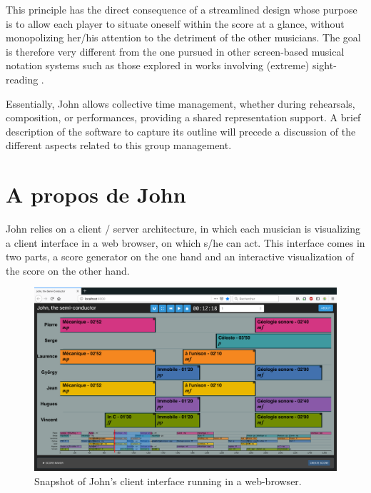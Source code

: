 This principle has the direct consequence of a streamlined design whose purpose is to allow each player to situate oneself within the score at a glance, without monopolizing her/his attention to the detriment of the other musicians. The goal is therefore very different from the one pursued in other screen-based musical notation systems such as those explored in works involving (extreme) sight-reading \cite{freeman_extreme_2008}.

Essentially, John allows collective time management, whether during rehearsals, composition, or performances, providing a shared representation support. A brief description of the software to capture its outline will precede a discussion of the different aspects related to this group management.

\section{A propos de John}
John relies on a client / server architecture, in which each musician is visualizing a client interface in a web browser, on which s/he can act. This interface comes in two parts, a score generator on the one hand and an interactive visualization of the score on the other hand.

\begin{figure}[htb]
	\includegraphics[width=\textwidth]{gfx/notation/John-snapshot.png}
	\caption{Snapshot of John's client interface running in a web-browser.}
	\label{fig:notation:john-snapshot}
\end{figure}

